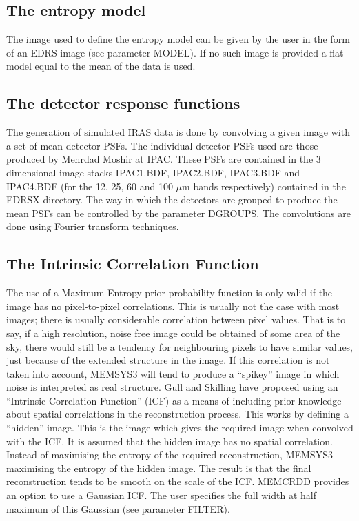\subsection {The entropy model}
The image used to define the entropy model can be given by the user in the form
of an EDRS image (see parameter MODEL). If no such image is provided a flat
model equal to the mean of the data is used.

\subsection {The detector response functions}
The generation of simulated IRAS data is done by convolving a given image with
a set of mean detector PSFs. The individual detector PSFs used are those
produced by Mehrdad Moshir at IPAC. These PSFs are contained in the 3
dimensional image stacks IPAC1.BDF, IPAC2.BDF, IPAC3.BDF and IPAC4.BDF
(for the 12, 25, 60 and 100 $\mu$m bands respectively) contained in the EDRSX
directory.
The way in which the detectors are grouped
to produce the mean PSFs can be controlled by the parameter DGROUPS. The
convolutions are done using Fourier transform techniques.

\subsection {The Intrinsic Correlation Function}
\label {SEC:ICFA}

The use of a Maximum Entropy prior probability function is only valid if the
image has no pixel-to-pixel correlations. This is usually not the case with
most images; there is usually considerable correlation between pixel values.
That is to say, if a high resolution, noise free image could be obtained of
some area of the sky, there would still be a tendency for neighbouring pixels
to have similar values, just because of the extended structure in the image. If
this correlation is not taken into account, MEMSYS3 will tend to produce a
``spikey'' image in which noise is interpreted as real structure. Gull and
Skilling have proposed using an ``Intrinsic Correlation Function'' (ICF) as a
means of including prior knowledge about spatial correlations in the
reconstruction process. This works by defining a ``hidden'' image. This is the
image which gives the required image when convolved with the ICF. It is assumed
that the hidden image has no spatial correlation. Instead of maximising the
entropy of the required reconstruction, MEMSYS3 maximising the entropy of the
hidden image. The result is that the final reconstruction tends to be smooth on
the scale of the ICF. MEMCRDD provides an option to use a Gaussian ICF. The
user specifies the full width at half maximum of this Gaussian (see parameter
FILTER).


